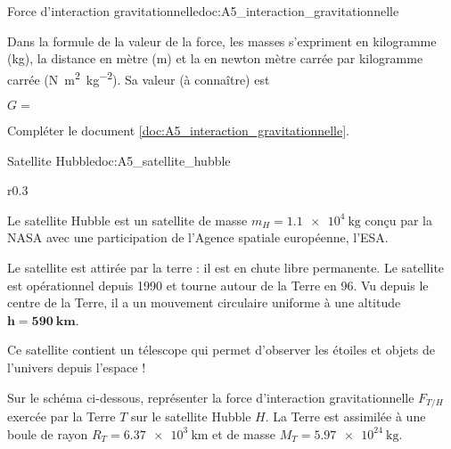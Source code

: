 \begin{doc}{Force d'interaction gravitationnelle}{doc:A5_interaction_gravitationnelle}
\begin{encart}
    Dans la formule de la valeur de la force, les masses s'expriment en kilogramme (\unit{\kg}),
    la distance en mètre (\unit{\m}) et
    la  en newton mètre carrée par kilogramme carrée (\unit{\newton \m\squared \per\kg\squared}).
    Sa valeur (à connaître) est 
    \begin{center}
      $G =$ 
    \end{center}
  \end{encart}
\end{doc}

\numeroQuestion Compléter le document \ref{doc:A5_interaction_gravitationnelle}.





\begin{doc}{Satellite Hubble}{doc:A5_satellite_hubble}
  \begin{wrapfigure}{r}{0.3\linewidth}
    \vspace*{-24pt}
    \centering
  \end{wrapfigure}
  
  Le satellite Hubble est un satellite de masse $m_H = \qty{1,1e4}{\kg}$ conçu par la NASA avec une  participation de l'Agence spatiale européenne, l'ESA.
  
  Le satellite est attirée par la terre : il est en chute libre permanente.
  Le satellite est opérationnel depuis 1990 et tourne autour de la Terre en \qty{96}{\min}.
  Vu depuis le centre de la Terre, il a un mouvement circulaire uniforme à une altitude $\mathbf{h = \qty{590}{\km}}$.
  
  Ce satellite contient un télescope qui permet d’observer les étoiles et objets de l’univers depuis l’espace !
\end{doc}

\mesure 
Sur le schéma ci-dessous, représenter la force d’interaction gravitationnelle $F_{T/H}$ exercée par la Terre $T$ sur le satellite Hubble $H$.
La Terre est assimilée à une boule de rayon $R_T = \qty{6,37e3}{\km}$ et de masse $M_T = \qty{5,97e24}{\kg}$.

